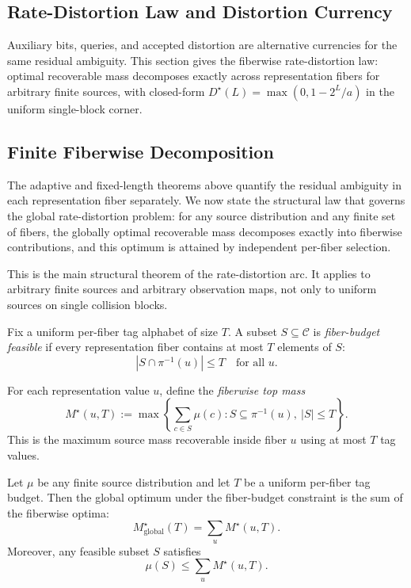 \subsection{Rate-Distortion Law and Distortion Currency}

Auxiliary bits, queries, and accepted distortion are alternative currencies for the same residual ambiguity. This section gives the fiberwise rate-distortion law: optimal recoverable mass decomposes exactly across representation fibers for arbitrary finite sources, with closed-form $D^\star(L)=\max(0,1-2^L/a)$ in the uniform single-block corner.

\subsection{Finite Fiberwise Decomposition}\label{sec:fiberwise-decomposition}

The adaptive and fixed-length theorems above quantify the residual ambiguity in each representation fiber separately. We now state the structural law that governs the global rate-distortion problem: for any source distribution and any finite set of fibers, the globally optimal recoverable mass decomposes exactly into fiberwise contributions, and this optimum is attained by independent per-fiber selection.

This is the main structural theorem of the rate-distortion arc. It applies to arbitrary finite sources and arbitrary observation maps, not only to uniform sources on single collision blocks.

\begin{definition}
Fix a uniform per-fiber tag alphabet of size $T$. A subset $S \subseteq \mathcal C$ is \emph{fiber-budget feasible} if every representation fiber contains at most $T$ elements of $S$:
\[
|S \cap \pi^{-1}(u)| \le T \quad \text{for all } u.
\]
\end{definition}

\begin{definition}
For each representation value $u$, define the \emph{fiberwise top mass}
\[
M^\star(u, T) := \max\left\{\sum_{c \in S} \mu(c) : S \subseteq \pi^{-1}(u),\ |S| \le T\right\}.
\]
This is the maximum source mass recoverable inside fiber $u$ using at most $T$ tag values.
\end{definition}

\begin{theorem}\label{thm:fiberwise-decomposition}
Let $\mu$ be any finite source distribution and let $T$ be a uniform per-fiber tag budget. Then the global optimum under the fiber-budget constraint is the sum of the fiberwise optima:
\[
M^\star_{\mathrm{global}}(T) = \sum_u M^\star(u, T).
\]
Moreover, any feasible subset $S$ satisfies
\[
\mu(S) \le \sum_u M^\star(u, T).
\]
\end{theorem}

